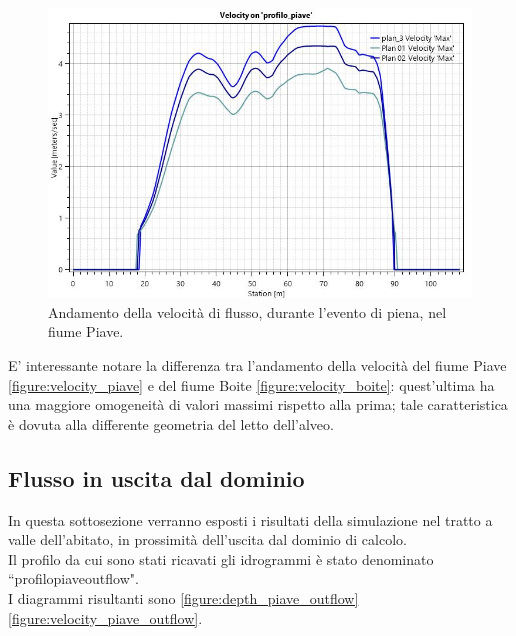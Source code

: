 \begin{figure}[H] \centering
    \includegraphics[scale=0.5]{immagini/velocity_piave.JPG}
    \caption{Andamento della velocità di flusso, durante l'evento di piena, nel fiume Piave.}
    \label{figure:velocity_piave}
\end{figure}

E' interessante notare la differenza tra l'andamento della velocità del fiume Piave \eqref{figure:velocity_piave} e del fiume Boite \eqref{figure:velocity_boite}: quest'ultima ha una maggiore omogeneità di valori massimi rispetto alla prima; tale caratteristica è dovuta alla differente geometria del letto dell'alveo.

\subsection{Flusso in uscita dal dominio}
In questa sottosezione verranno esposti i risultati della simulazione nel tratto a valle dell'abitato, in prossimità dell'uscita dal dominio di calcolo.\\
Il profilo da cui sono stati ricavati gli idrogrammi è stato denominato  ``profilo\textunderscore piave\textunderscore outflow".\\
I diagrammi risultanti sono \eqref{figure:depth_piave_outflow}\eqref{figure:velocity_piave_outflow}.

